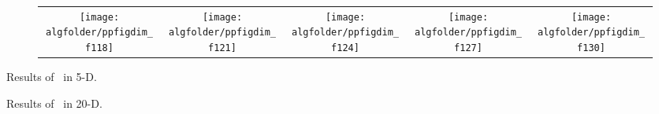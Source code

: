 \documentclass{article}
\newcommand{\ERT}{\ensuremath{\mathrm{ERT}}}
\newcommand{\Df}{\ensuremath{\Delta f}}
\newcommand{\nbFEs}{\ensuremath{\mathrm{\#FEs}}}
\newcommand{\fopt}{\ensuremath{f_\mathrm{opt}}}
\newcommand{\bbobdatapath}{ppdata/} %
\begin{document}
\begin{figure}[htbp!]
\begin{tabular}{@{}c@{}c@{}c@{}c@{}c@{}}
\texttt{[image: \\algfolder/ppfigdim\_f118]}&
\texttt{[image: \\algfolder/ppfigdim\_f121]}&
\texttt{[image: \\algfolder/ppfigdim\_f124]}&
\texttt{[image: \\algfolder/ppfigdim\_f127]}&
\texttt{[image: \\algfolder/ppfigdim\_f130]}
\end{tabular}
\vspace*{-1ex}
\caption{\label{fig:ERTgraphs\algfolder}
}
\end{figure}
\begin{table}[htbp!]
\centering
\scriptsize

\caption{\label{tab:ERT05D\algfolder} \bbobpptablecaption{} Results of \algname\ in 5-D.}
\end{table}
\begin{table}[htbp!]
\centering
\scriptsize

\caption{\label{tab:ERT20D\algfolder} \bbobpptablecaption{} Results of \algname\ in 20-D.}
\end{table}

\end{document}
